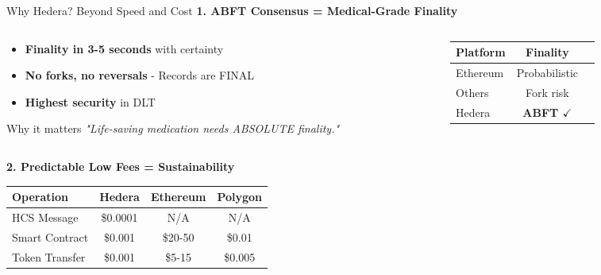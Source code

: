 \documentclass[aspectratio=169,xcolor=dvipsnames,20pt]{beamer}
\newcommand{\checkitem}{\item[\color{SuccessGreen}\faCheckCircle]}
\begin{document}
\begin{frame}[shrink=10]{Why Hedera? Beyond Speed and Cost}
\small
  \textbf{\textcolor{HederaPurple}{1. ABFT Consensus = Medical-Grade Finality}}

  \begin{columns}[T]
    \begin{column}{0.6\textwidth}
      \begin{itemize}
        \checkitem \textbf{Finality in 3-5 seconds} with certainty
        \checkitem \textbf{No forks, no reversals} - Records are FINAL
        \checkitem \textbf{Highest security} in DLT
      \end{itemize}

      \vspace{0.15cm}

      \begin{block}{Why it matters}
        \small
        \textit{"Life-saving medication needs ABSOLUTE finality."}
      \end{block}
    \end{column}

    \begin{column}{0.4\textwidth}
      \begin{table}
        \scriptsize
        \begin{tabular}{lcc}
          \toprule
          \textbf{Platform} & \textbf{Finality} \\
          \midrule
          \textcolor{DangerRed}{Ethereum} & Probabilistic \\
          \textcolor{WarningOrange}{Others} & Fork risk \\
          \textcolor{SuccessGreen}{Hedera} & \textbf{ABFT $\checkmark$} \\
          \bottomrule
        \end{tabular}
      \end{table}
    \end{column}
  \end{columns}

  \vspace{0.2cm}

  \textbf{\textcolor{HederaPurple}{2. Predictable Low Fees = Sustainability}}

  \begin{table}
    \scriptsize
    \begin{tabular}{lccc}
      \toprule
      \textbf{Operation} & \textbf{Hedera} & \textbf{Ethereum} & \textbf{Polygon} \\
      \midrule
      HCS Message & \textcolor{SuccessGreen}{\$0.0001} & N/A & N/A \\
      Smart Contract & \textcolor{SuccessGreen}{\$0.001} & \textcolor{DangerRed}{\$20-50} & \$0.01 \\
      Token Transfer & \textcolor{SuccessGreen}{\$0.001} & \textcolor{DangerRed}{\$5-15} & \$0.005 \\
      \bottomrule
    \end{tabular}
  \end{table}


\end{frame}
\end{document}
